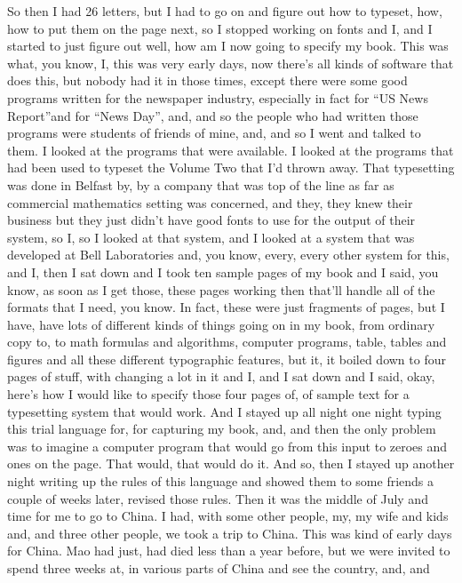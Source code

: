 \documentclass[]{article}
\begin{document}
So then I had 26 letters, but I had to go on and figure out how to
typeset, how, how to put them on the page next, so I stopped working on
fonts and I, and I started to just figure out well, how am I now going
to specify my book. This was what, you know, I, this was very early
days, now there's all kinds of software that does this, but nobody had
it in those times, except there were some good programs written for the
newspaper industry, especially in fact for ``US News Report''and for
``News Day'', and, and so the people who had written those programs were
students of friends of mine, and, and so I went and talked to them. I
looked at the programs that were available. I looked at the programs
that had been used to typeset the Volume Two that I'd thrown away. That
typesetting was done in Belfast by, by a company that was top of the
line as far as commercial mathematics setting was concerned, and they,
they knew their business but they just didn't have good fonts to use for
the output of their system, so I, so I looked at that system, and I
looked at a system that was developed at Bell Laboratories and, you
know, every, every other system for this, and I, then I sat down and I
took ten sample pages of my book and I said, you know, as soon as I get
those, these pages working then that'll handle all of the formats that I
need, you know. In fact, these were just fragments of pages, but I have,
have lots of different kinds of things going on in my book, from
ordinary copy to, to math formulas and algorithms, computer programs,
table, tables and figures and all these different typographic features,
but it, it boiled down to four pages of stuff, with changing a lot in it
and I, and I sat down and I said, okay, here's how I would like to
specify those four pages of, of sample text for a typesetting system
that would work. And I stayed up all night one night typing this trial
language for, for capturing my book, and, and then the only problem was
to imagine a computer program that would go from this input to zeroes
and ones on the page. That would, that would do it. And so, then I
stayed up another night writing up the rules of this language and showed
them to some friends a couple of weeks later, revised those rules. Then
it was the middle of July and time for me to go to China. I had, with
some other people, my, my wife and kids and, and three other people, we
took a trip to China. This was kind of early days for China. Mao had
just, had died less than a year before, but we were invited to spend
three weeks at, in various parts of China and see the country, and, and
\end{document}
